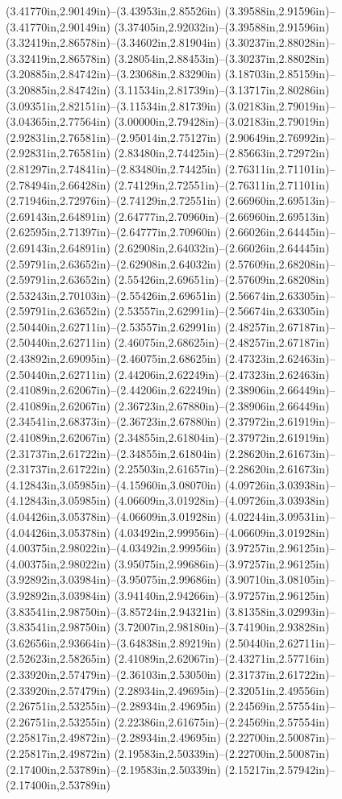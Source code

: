 (3.41770in,2.90149in)--(3.43953in,2.85526in) (3.39588in,2.91596in)--(3.41770in,2.90149in) (3.37405in,2.92032in)--(3.39588in,2.91596in) (3.32419in,2.86578in)--(3.34602in,2.81904in) (3.30237in,2.88028in)--(3.32419in,2.86578in) (3.28054in,2.88453in)--(3.30237in,2.88028in) (3.20885in,2.84742in)--(3.23068in,2.83290in) (3.18703in,2.85159in)--(3.20885in,2.84742in) (3.11534in,2.81739in)--(3.13717in,2.80286in) (3.09351in,2.82151in)--(3.11534in,2.81739in) (3.02183in,2.79019in)--(3.04365in,2.77564in) (3.00000in,2.79428in)--(3.02183in,2.79019in) (2.92831in,2.76581in)--(2.95014in,2.75127in) (2.90649in,2.76992in)--(2.92831in,2.76581in) (2.83480in,2.74425in)--(2.85663in,2.72972in) (2.81297in,2.74841in)--(2.83480in,2.74425in) (2.76311in,2.71101in)--(2.78494in,2.66428in) (2.74129in,2.72551in)--(2.76311in,2.71101in) (2.71946in,2.72976in)--(2.74129in,2.72551in) (2.66960in,2.69513in)--(2.69143in,2.64891in) (2.64777in,2.70960in)--(2.66960in,2.69513in) (2.62595in,2.71397in)--(2.64777in,2.70960in) (2.66026in,2.64445in)--(2.69143in,2.64891in) (2.62908in,2.64032in)--(2.66026in,2.64445in) (2.59791in,2.63652in)--(2.62908in,2.64032in) (2.57609in,2.68208in)--(2.59791in,2.63652in) (2.55426in,2.69651in)--(2.57609in,2.68208in) (2.53243in,2.70103in)--(2.55426in,2.69651in) (2.56674in,2.63305in)--(2.59791in,2.63652in) (2.53557in,2.62991in)--(2.56674in,2.63305in) (2.50440in,2.62711in)--(2.53557in,2.62991in) (2.48257in,2.67187in)--(2.50440in,2.62711in) (2.46075in,2.68625in)--(2.48257in,2.67187in) (2.43892in,2.69095in)--(2.46075in,2.68625in) (2.47323in,2.62463in)--(2.50440in,2.62711in) (2.44206in,2.62249in)--(2.47323in,2.62463in) (2.41089in,2.62067in)--(2.44206in,2.62249in) (2.38906in,2.66449in)--(2.41089in,2.62067in) (2.36723in,2.67880in)--(2.38906in,2.66449in) (2.34541in,2.68373in)--(2.36723in,2.67880in) (2.37972in,2.61919in)--(2.41089in,2.62067in) (2.34855in,2.61804in)--(2.37972in,2.61919in) (2.31737in,2.61722in)--(2.34855in,2.61804in) (2.28620in,2.61673in)--(2.31737in,2.61722in) (2.25503in,2.61657in)--(2.28620in,2.61673in) (4.12843in,3.05985in)--(4.15960in,3.08070in) (4.09726in,3.03938in)--(4.12843in,3.05985in) (4.06609in,3.01928in)--(4.09726in,3.03938in) (4.04426in,3.05378in)--(4.06609in,3.01928in) (4.02244in,3.09531in)--(4.04426in,3.05378in) (4.03492in,2.99956in)--(4.06609in,3.01928in) (4.00375in,2.98022in)--(4.03492in,2.99956in) (3.97257in,2.96125in)--(4.00375in,2.98022in) (3.95075in,2.99686in)--(3.97257in,2.96125in) (3.92892in,3.03984in)--(3.95075in,2.99686in) (3.90710in,3.08105in)--(3.92892in,3.03984in) (3.94140in,2.94266in)--(3.97257in,2.96125in) (3.83541in,2.98750in)--(3.85724in,2.94321in) (3.81358in,3.02993in)--(3.83541in,2.98750in) (3.72007in,2.98180in)--(3.74190in,2.93828in) (3.62656in,2.93664in)--(3.64838in,2.89219in) (2.50440in,2.62711in)--(2.52623in,2.58265in) (2.41089in,2.62067in)--(2.43271in,2.57716in) (2.33920in,2.57479in)--(2.36103in,2.53050in) (2.31737in,2.61722in)--(2.33920in,2.57479in) (2.28934in,2.49695in)--(2.32051in,2.49556in) (2.26751in,2.53255in)--(2.28934in,2.49695in) (2.24569in,2.57554in)--(2.26751in,2.53255in) (2.22386in,2.61675in)--(2.24569in,2.57554in) (2.25817in,2.49872in)--(2.28934in,2.49695in) (2.22700in,2.50087in)--(2.25817in,2.49872in) (2.19583in,2.50339in)--(2.22700in,2.50087in) (2.17400in,2.53789in)--(2.19583in,2.50339in) (2.15217in,2.57942in)--(2.17400in,2.53789in) 